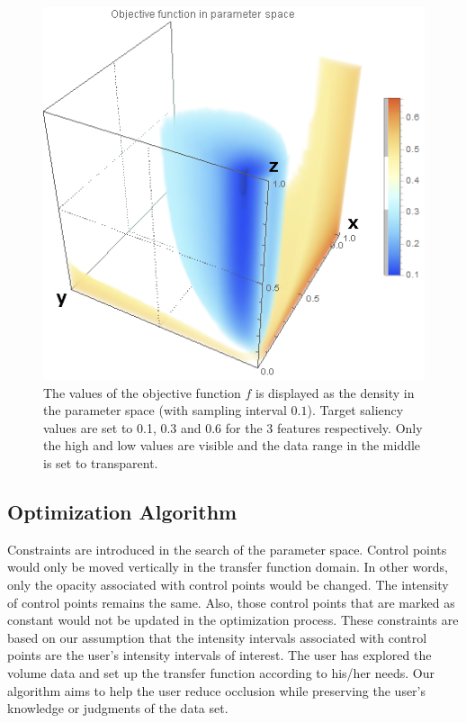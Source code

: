 \begin{figure}
	\centering
	\begin{minipage}{.6\textwidth}
		\includegraphics[width=1\linewidth]{images/parameterspace}
	\end{minipage}
	\caption{The values of the objective function $  f $ is displayed as the density in the parameter space (with sampling interval $ 0.1 $). Target saliency values are set to 0.1, 0.3 and 0.6 for the 3 features respectively. Only the high and low values are visible and the data range in the middle is set to transparent.}
	\label{fig:nucleon_parameterspace}
\end{figure}


\subsection{Optimization Algorithm}
Constraints are introduced in the search of the parameter space. Control points would only be moved vertically in the transfer function domain. In other words, only the opacity associated with control points would be changed. The intensity of control points remains the same. Also, those control points that are marked as constant would not be updated in the optimization process.
These constraints are based on our assumption that the intensity intervals associated with control points are the user's intensity intervals of interest. The user has explored the volume data and set up the transfer function according to his/her needs. Our algorithm aims to help the user reduce occlusion while preserving the user's knowledge or judgments of the data set.



